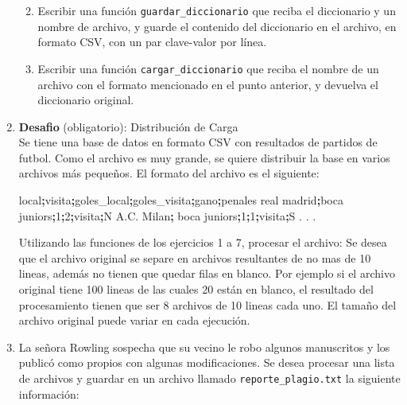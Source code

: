 \documentclass[
  letterpaper,
  DIV=11,
  numbers=noendperiod]{scrreprt}
\newenvironment{Shaded}{\begin{snugshade}}{\end{snugshade}}
\newcommand{\BuiltInTok}[1]{\textcolor[rgb]{0.00,0.23,0.31}{#1}}
\newcommand{\ExtensionTok}[1]{\textcolor[rgb]{0.00,0.23,0.31}{#1}}
\newcommand{\KeywordTok}[1]{\textcolor[rgb]{0.00,0.23,0.31}{\textbf{#1}}}
\newcommand{\NormalTok}[1]{\textcolor[rgb]{0.00,0.23,0.31}{#1}}
\providecommand{\tightlist}{%
  \setlength{\itemsep}{0pt}\setlength{\parskip}{0pt}}\usepackage{longtable,booktabs,array}
\begin{document}
\begin{enumerate}
  \begin{enumerate}
  \def\labelenumii{\alph{enumii}.}
  \tightlist
  \item
    Escribir una función \texttt{guardar\_diccionario} que reciba el
    diccionario y un nombre de archivo, y guarde el contenido del
    diccionario en el archivo, en formato CSV, con un par clave-valor
    por línea.
  \item
    Escribir una función \texttt{cargar\_diccionario} que reciba el
    nombre de un archivo con el formato mencionado en el punto anterior,
    y devuelva el diccionario original.
  \end{enumerate}
\item
  \textbf{Desafio} (obligatorio): Distribución de Carga\\
  Se tiene una base de datos en formato CSV con resultados de partidos
  de futbol. Como el archivo es muy grande, se quiere distribuir la base
  en varios archivos más pequeños. El formato del archivo es el
  siguiente:

\begin{Shaded}
\begin{Highlighting}[]
\BuiltInTok{local}\KeywordTok{;}\ExtensionTok{visita}\KeywordTok{;}\ExtensionTok{goles\_local}\KeywordTok{;}\ExtensionTok{goles\_visita}\KeywordTok{;}\ExtensionTok{gano}\KeywordTok{;}\ExtensionTok{penales}
\ExtensionTok{real}\NormalTok{ madrid}\KeywordTok{;}\ExtensionTok{boca}\NormalTok{ juniors}\KeywordTok{;}\ExtensionTok{1}\KeywordTok{;}\ExtensionTok{2}\KeywordTok{;}\ExtensionTok{visita}\KeywordTok{;}\ExtensionTok{N}
\ExtensionTok{A.C.}\NormalTok{ Milan}\KeywordTok{;} \ExtensionTok{boca}\NormalTok{ juniors}\KeywordTok{;}\ExtensionTok{1}\KeywordTok{;}\ExtensionTok{1}\KeywordTok{;}\ExtensionTok{visita}\KeywordTok{;}\ExtensionTok{S}
\BuiltInTok{.}
\BuiltInTok{.}
\BuiltInTok{.}
\end{Highlighting}
\end{Shaded}

  Utilizando las funciones de los ejercicios 1 a 7, procesar el archivo:
  Se desea que el archivo original se separe en archivos resultantes de
  no mas de 10 lineas, además no tienen que quedar filas en blanco. Por
  ejemplo si el archivo original tiene 100 lineas de las cuales 20 están
  en blanco, el resultado del procesamiento tienen que ser 8 archivos de
  10 lineas cada uno. El tamaño del archivo original puede variar en
  cada ejecución.
\item
  La señora Rowling sospecha que su vecino le robo algunos manuscritos y
  los publicó como propios con algunas modificaciones. Se desea procesar
  una lista de archivos y guardar en un archivo llamado
  \texttt{reporte\_plagio.txt} la siguiente información:


\end{enumerate}
\end{document}
